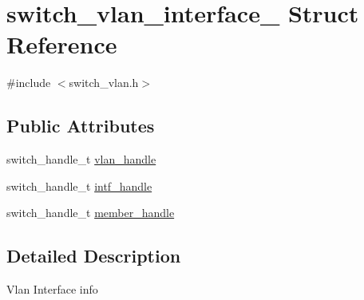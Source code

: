 \hypertarget{structswitch__vlan__interface__}{\section{switch\+\_\+vlan\+\_\+interface\+\_\+ Struct Reference}
\label{structswitch__vlan__interface__}
}


{\ttfamily \#include $<$switch\+\_\+vlan.\+h$>$}

\subsection*{Public Attributes}
\begin{DoxyCompactItemize}
\item 
switch\+\_\+handle\+\_\+t \hyperlink{structswitch__vlan__interface___a84a06c03b1622c743e736a494b78a4cb}{vlan\+\_\+handle}
\item 
switch\+\_\+handle\+\_\+t \hyperlink{structswitch__vlan__interface___a985fdd20dbc07d53a431cfd42fbed34a}{intf\+\_\+handle}
\item 
switch\+\_\+handle\+\_\+t \hyperlink{structswitch__vlan__interface___a5c82f91ef7056f4e3d4562dd9aa67166}{member\+\_\+handle}
\end{DoxyCompactItemize}


\subsection{Detailed Description}
Vlan Interface info 

